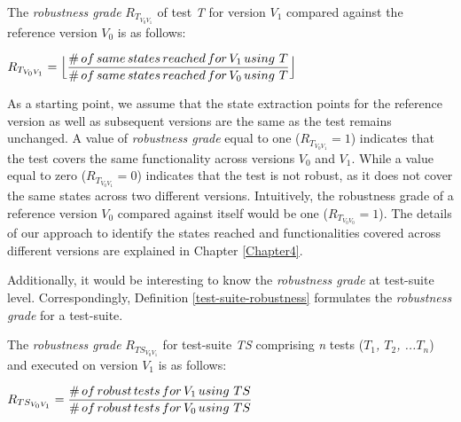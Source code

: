 \theoremstyle{definition}

\begin{definition}{The \textit{robustness grade} $R_{T_{V_{0}V_{1}}}$ of test \textit{T} for version \textit{$V_{1}$} compared against the reference version \textit{$V_{0}$} is as follows:}
\begin{center}
\vspace{0.5cm}
$R_{T_{V_{0}V_{1}}} = \displaystyle \Bigl\lfloor\frac{\#\thinspace of \thinspace same \thinspace states \thinspace reached \thinspace for \thinspace V_{1} \thinspace using \thinspace \thinspace T}{\# \thinspace of \thinspace same \thinspace states \thinspace reached  \thinspace for \thinspace V_{0} \thinspace using \thinspace \thinspace T}\Bigr\rfloor\ $ \normalsize 
\end{center}
\label{test-case-robustness} 
\end{definition} 

As a starting point, we assume that the state extraction points for the reference version as well as subsequent versions are the same as the test remains unchanged. 
A value of\textit{
robustness grade} equal to one ($R_{T_{V_{0}V_{1}}}=1$) indicates that the test covers the same functionality across versions \textit{$V_{0}$} and \textit{$V_{1}$}. 
While a value equal to zero ($R_{T_{V_{0}V_{1}}}=0$) indicates that the test is not robust, as it does not cover the same states across two different versions. Intuitively, the robustness grade of a reference version $V_{0}$ compared against itself would be one ($R_{T_{V_{0}V_{0}}}=1$). The details of our approach to identify the states reached and functionalities covered across different versions are explained in Chapter \ref{Chapter4}.

Additionally, it would be interesting to know the \textit{robustness grade} at test-suite level. Correspondingly, Definition \ref{test-suite-robustness} formulates the \textit{robustness grade} for a test-suite.

\theoremstyle{definition}
\begin{definition}{The \textit{robustness grade} $R_{TS_{V_{0}V_{1}}}$ for test-suite \textit{TS} comprising \textit{n} tests (\textit{$T_1$, $T_2$, ...$T_n$}) and executed on version \textit{$V_{1}$} is as follows:}
\vspace{0.5cm}
\begin{center}
$R_{TS_{V_{0}V_{1}}} = \displaystyle \frac{\#\thinspace of \thinspace robust \thinspace tests \thinspace for \thinspace V_{1} \thinspace using \thinspace \thinspace TS}{\# \thinspace of \thinspace robust \thinspace tests \thinspace for  \thinspace V_{0} \thinspace using \thinspace \thinspace TS}$ \normalsize
\end{center}
\label{test-suite-robustness}
\end{definition}

